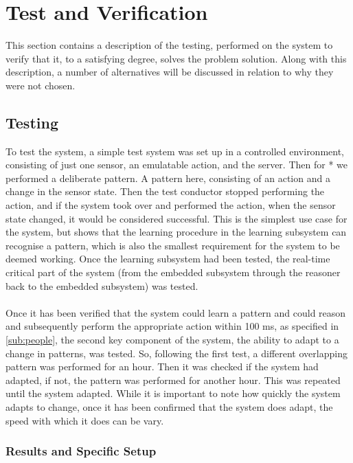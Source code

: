 \chapter{Test and Verification}
This section contains a description of the testing, performed on the system to verify that it, to a satisfying degree, solves the problem solution. Along with this description, a number of alternatives will be discussed in relation to why they were not chosen.

\section{Testing}
To test the system, a simple test system was set up in a controlled environment, consisting of just one sensor, an emulatable action, and the server. Then for * we performed a deliberate pattern. A pattern here, consisting of an action and a change in the sensor state. Then the test conductor stopped performing the action, and if the system took over and performed the action, when the sensor state changed, it would be considered successful. This is the simplest use case for the system, but shows that the learning procedure in the learning subsystem can recognise a pattern, which is also the smallest requirement for the system to be deemed working. Once the learning subsystem had been tested, the real-time critical part of the system (from the embedded subsystem through the reasoner back to the embedded subsystem) was tested.
\\\\
Once it has been verified that the system could learn a pattern and could reason and subsequently perform the appropriate action within 100 ms, as specified in \cref{sub:people}, the second key component of the system, the ability to adapt to a change in patterns, was tested. So, following the first test, a different overlapping pattern was performed for an hour. Then it was checked if the system had adapted, if not, the pattern was performed for another hour. This was repeated until the system adapted. While it is important to note how quickly the system adapts to change, once it has been confirmed that the system does adapt, the speed with which it does can be vary.
\subsection{Results and Specific Setup}


